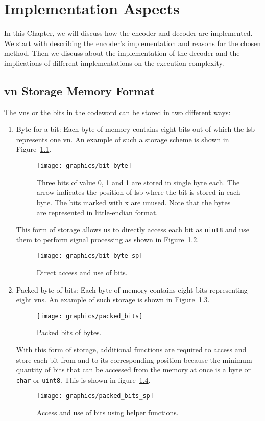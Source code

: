 \chapter{Implementation Aspects}
In this Chapter, we will discuss how the encoder and decoder are implemented. We start with describing the encoder's implementation and reasons for the chosen method. Then we discuss about the implementation of the decoder and the implications of different implementations on the execution complexity.
\section{\acrlong{vn} Storage Memory Format}
The \glspl{vn} or the bits in the codeword can be stored in two different ways:
\begin{enumerate}
  \item Byte for a bit: Each byte of memory contains eight bits out of which the \gls{lsb} represents one \gls{vn}. An example of such a storage scheme is shown in Figure~\ref{fig:bit_byte}.
  \begin{figure}[htbp]
    \centering
    \texttt{[image: graphics/bit\_byte]}
    \caption{Three bits of value 0, 1 and 1 are stored in single byte each. The arrow indicates the position of \gls{lsb} where the bit is stored in each byte. The bits marked with x are unused. Note that the bytes are represented in little-endian format.}
    \label{fig:bit_byte}
  \end{figure}
  This form of storage allows us to directly access each bit as \texttt{uint8} and use them to perform signal processing as shown in Figure~\ref{fig:bit_byte_sp}.
  \begin{figure}[htbp]
    \centering
    \texttt{[image: graphics/bit\_byte\_sp]}
    \caption{Direct access and use of bits.}
    \label{fig:bit_byte_sp}
  \end{figure}
  \item Packed byte of bits: Each byte of memory contains eight bits representing eight \glspl{vn}. An example of such storage is shown in Figure~\ref{fig:packed_bits}.
  \begin{figure}[htbp]
    \centering
    \texttt{[image: graphics/packed\_bits]}
    \caption{Packed bits of bytes.}
    \label{fig:packed_bits}
  \end{figure}
  With this form of storage, additional functions are required to access and store each bit from and to its corresponding position because the minimum quantity of bits that can be accessed from the memory at once is a byte or \texttt{char} or \texttt{uint8}. This is shown in figure~\ref{fig:packed_spb}.
  \begin{figure}[htbp]
    \centering
    \texttt{[image: graphics/packed\_bits\_sp]}
    \caption{Access and use of bits using helper functions.}
    \label{fig:packed_spb}
  \end{figure}
\end{enumerate}
